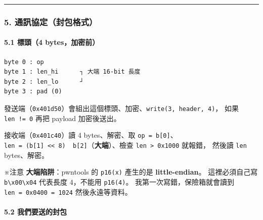 \documentclass[10pt,a4paper]{article}
\renewenvironment{quote}{%
  \begin{mdframed}[linewidth=0pt,innerleftmargin=0pt,innerrightmargin=0pt,
    innerbottommargin=0pt,innertopmargin=0pt,skipabove=0.55em,skipbelow=0.55em,
    leftmargin=0.9em,rightmargin=0.4em,startcode={\color{quotebar}\vrule width 2.6pt},%
    endcode={}]%
  \itshape\color{black}%
}{%
  \end{mdframed}%
}
\begin{document}
\begin{center}\rule{0.5\linewidth}{0.5pt}\end{center}

\subsubsection{5.
通訊協定（封包格式）}\label{ux901aux8a0aux5354ux5b9aux5c01ux5305ux683cux5f0f}

\paragraph{5.1 標頭（4
bytes，加密前）}\label{ux6a19ux982d4-bytesux52a0ux5bc6ux524d}

\begin{Verbatim}[breaklines=true,breakanywhere=true,breakautoindent=false,fontsize=\fontsize{7.0}{9.5}\selectfont]
byte 0 : op
byte 1 : len_hi      ┐ 大端 16-bit 長度
byte 2 : len_lo      ┘
byte 3 : pad (0)
\end{Verbatim}

發送端（\texttt{0x401d50}）會組出這個標頭、加密、\texttt{write(3,\allowbreak{}\ \allowbreak{}header,\allowbreak{}\ \allowbreak{}4)}，
如果 \texttt{len\ \allowbreak{}!=\ \allowbreak{}0} 再把 payload 加密後送出。

接收端（\texttt{0x401c40}）讀 4 bytes、解密、取
\texttt{op\ \allowbreak{}=\ \allowbreak{}b{[}0{]}}、
\texttt{len\ \allowbreak{}=\ \allowbreak{}(b{[}1{]}\ \allowbreak{}\textless{}\allowbreak{}\textless{}\allowbreak{}\ \allowbreak{}8)\ \allowbreak{}\textbar{}\allowbreak{}\ \allowbreak{}b{[}2{]}}（\textbf{大端}）、檢查
\texttt{len\ \allowbreak{}\textgreater{}\allowbreak{}\ \allowbreak{}0x1000} 就報錯， 然後讀 \texttt{len}
bytes、解密。

\begin{quote}
※注意 \textbf{大端陷阱}：pwntools 的 \texttt{p16(x)} 產生的是
\textbf{little-endian}。 這裡必須自己寫
\texttt{b\textquotesingle{}\allowbreak{}\textbackslash{}\allowbreak{}x00\textbackslash{}\allowbreak{}x04\textquotesingle{}\allowbreak{}}
代表長度 4，不能用 \texttt{p16(4)}。 我第一次寫錯，保險箱就會讀到
\texttt{len\ \allowbreak{}=\ \allowbreak{}0x0400\ \allowbreak{}=\ \allowbreak{}1024} 然後永遠等資料。
\end{quote}

\paragraph{5.2
我們要送的封包}\label{ux6211ux5011ux8981ux9001ux7684ux5c01ux5305}
\end{document}
